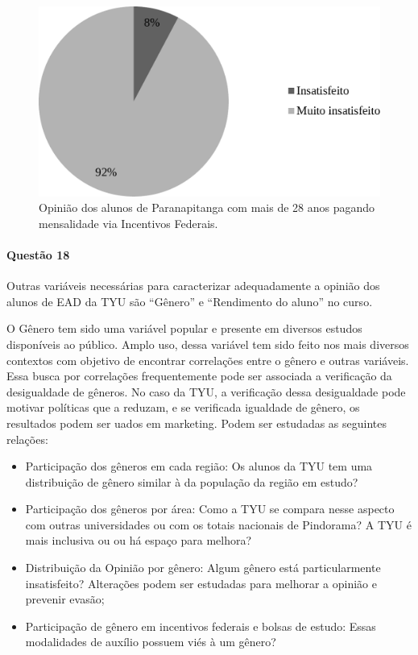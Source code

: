 \documentclass[10pt,a4paper,oneside]{article}
\newcommand{\para}{Paranapitanga\xspace}
\begin{document}
\begin{figure}[!h]
	\centering
	\includegraphics[width=\linewidth]{plots/q17c.pdf}
	\caption{Opinião dos alunos de \para com mais de 28 anos pagando mensalidade via Incentivos Federais.}
	\label{fig:opiniao-28anos-incFederaiso}
\end{figure}

\FloatBarrier
\paragraph{Questão 18}
Outras variáveis necessárias para caracterizar adequadamente a opinião dos alunos de EAD da TYU são  ``Gênero'' e ``Rendimento do aluno'' no curso.

O Gênero tem sido uma variável popular e presente em diversos estudos disponíveis ao público. 
Amplo uso, dessa variável tem sido feito nos mais diversos contextos com objetivo de encontrar correlações entre o gênero e outras variáveis. Essa busca por correlações frequentemente pode ser associada a verificação da desigualdade de gêneros. No caso da TYU, a verificação dessa desigualdade pode motivar políticas que a reduzam, e se verificada igualdade de gênero, os resultados podem ser uados em marketing. Podem ser estudadas as seguintes relações:
\begin{itemize}
	\item Participação dos gêneros em cada região: Os alunos da TYU tem uma distribuição de gênero similar à da população da região em estudo?
	\item Participação dos gêneros por área: Como a TYU se compara nesse aspecto com outras universidades ou com os totais nacionais de Pindorama? A TYU é mais inclusiva ou ou há espaço para melhora?
	\item Distribuição da Opinião por gênero: Algum gênero está particularmente insatisfeito? Alterações podem ser estudadas para melhorar a opinião e prevenir evasão;
	\item Participação de gênero em incentivos federais e bolsas de estudo: Essas modalidades de auxílio possuem viés à um gênero?
\end{itemize}
\end{document}
